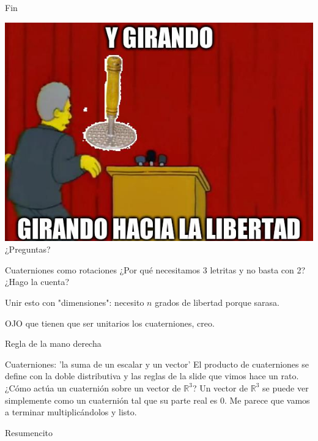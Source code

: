 \documentclass[10pt]{beamer}
\def\R{\mathbb{R}}
\begin{document}
\begin{frame}{Fin}

\includegraphics[scale=0.4]{chiste2.jpg} \\
\Huge{¿Preguntas?}
\end{frame}



\iffalse


\begin{frame}{Cuaterniones como rotaciones}
¿Por qué necesitamos 3 letritas y no basta con 2? ¿Hago la cuenta?

Unir esto con "dimensiones": necesito $n$ grados de libertad porque sarasa.

OJO que tienen que ser unitarios los cuaterniones, creo.

\end{frame}

\begin{frame}{Regla de la mano derecha}
\end{frame}

\begin{frame}
	Cuaterniones: 'la suma de un escalar y un vector'
	El producto de cuaterniones se define con la doble distributiva y las reglas de la slide que vimos hace un rato.
	¿Cómo actúa un cuaternión sobre un vector de $\R^3$? Un vector de $\R^3$ se puede ver simplemente como un cuaternión tal que su parte real es $0$. Me parece que vamos a terminar multiplicándolos y listo.

	
\end{frame}

\begin{frame}{Resumencito}

\end{frame}
\end{document}

